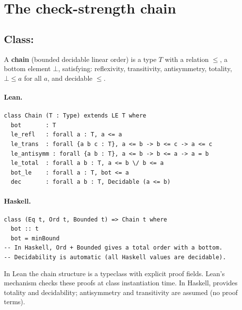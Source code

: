 \documentclass[11pt,a4paper]{article}
\begin{document}
\section{The check-strength chain}

\subsection{Class: }

\begin{defn}[Chain]
A \textbf{chain} (bounded decidable linear order) is a type $T$ with a
relation $\le$, a bottom element $\bot$, satisfying: reflexivity,
transitivity, antisymmetry, totality, $\bot \le a$ for all $a$, and
decidable $\le$.
\end{defn}

\paragraph{Lean.}
\begin{lstlisting}[style=lean]
class Chain (T : Type) extends LE T where
  bot       : T
  le_refl   : forall a : T, a <= a
  le_trans  : forall {a b c : T}, a <= b -> b <= c -> a <= c
  le_antisymm : forall {a b : T}, a <= b -> b <= a -> a = b
  le_total  : forall a b : T, a <= b \/ b <= a
  bot_le    : forall a : T, bot <= a
  dec       : forall a b : T, Decidable (a <= b)
\end{lstlisting}

\paragraph{Haskell.}
\begin{lstlisting}[style=haskell]
class (Eq t, Ord t, Bounded t) => Chain t where
  bot :: t
  bot = minBound
-- In Haskell, Ord + Bounded gives a total order with a bottom.
-- Decidability is automatic (all Haskell values are decidable).
\end{lstlisting}

\begin{fidelitynote}
In Lean the chain structure is a typeclass with explicit proof fields.
Lean's  mechanism checks these proofs at class instantiation
time.  In Haskell,  provides totality and decidability; antisymmetry
and transitivity are assumed (no proof terms).
\end{fidelitynote}
\end{document}
